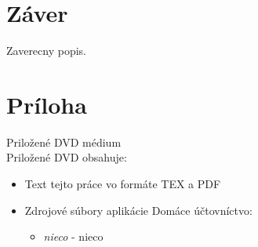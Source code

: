 \documentclass[12pt,oneside]{book}
\begin{document}
\chapter{Záver}\label{chap:outro}
 
Zaverecny popis.

\backmatter

\nocite{*}




\newcommand{\dbappendix}[1]{\chapter{#1}}
\appendix
\dbappendix{Príloha}\label{appA}
{\large Priložené DVD médium}\\

Priložené DVD obsahuje:\\
\begin{itemize}
\item Text tejto práce vo formáte TEX a PDF
\item Zdrojové súbory aplikácie Domáce účtovníctvo:
	\begin{itemize}
		\item {\em nieco} - nieco
	\end{itemize}
\end{itemize}
\end{document}

